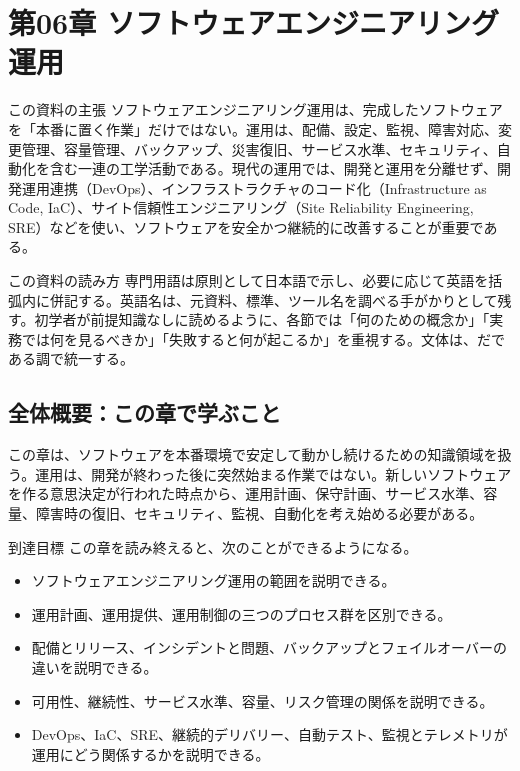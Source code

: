 \documentclass[a4paper,11pt]{ltjsarticle}
\numberwithin{figure}{section}
\numberwithin{table}{section}
\begin{document}
\section{第06章 ソフトウェアエンジニアリング運用}
\begin{pointbox}{この資料の主張}
  ソフトウェアエンジニアリング運用は、完成したソフトウェアを「本番に置く作業」だけではない。運用は、配備、設定、監視、障害対応、変更管理、容量管理、バックアップ、災害復旧、サービス水準、セキュリティ、自動化を含む一連の工学活動である。現代の運用では、開発と運用を分離せず、開発運用連携（DevOps）、インフラストラクチャのコード化（Infrastructure as Code, IaC）、サイト信頼性エンジニアリング（Site Reliability Engineering, SRE）などを使い、ソフトウェアを安全かつ継続的に改善することが重要である。
  \end{pointbox}

\begin{pointbox}{この資料の読み方}
  専門用語は原則として日本語で示し、必要に応じて英語を括弧内に併記する。英語名は、元資料、標準、ツール名を調べる手がかりとして残す。初学者が前提知識なしに読めるように、各節では「何のための概念か」「実務では何を見るべきか」「失敗すると何が起こるか」を重視する。文体は、だである調で統一する。
  \end{pointbox}





\subsection*{全体概要：この章で学ぶこと}

この章は、ソフトウェアを本番環境で安定して動かし続けるための知識領域を扱う。運用は、開発が終わった後に突然始まる作業ではない。新しいソフトウェアを作る意思決定が行われた時点から、運用計画、保守計画、サービス水準、容量、障害時の復旧、セキュリティ、監視、自動化を考え始める必要がある。

\begin{pointbox}{到達目標}
この章を読み終えると、次のことができるようになる。
\begin{itemize}
  \item ソフトウェアエンジニアリング運用の範囲を説明できる。
  \item 運用計画、運用提供、運用制御の三つのプロセス群を区別できる。
  \item 配備とリリース、インシデントと問題、バックアップとフェイルオーバーの違いを説明できる。
  \item 可用性、継続性、サービス水準、容量、リスク管理の関係を説明できる。
  \item DevOps、IaC、SRE、継続的デリバリー、自動テスト、監視とテレメトリが運用にどう関係するかを説明できる。
\end{itemize}
\end{pointbox}
\end{document}
